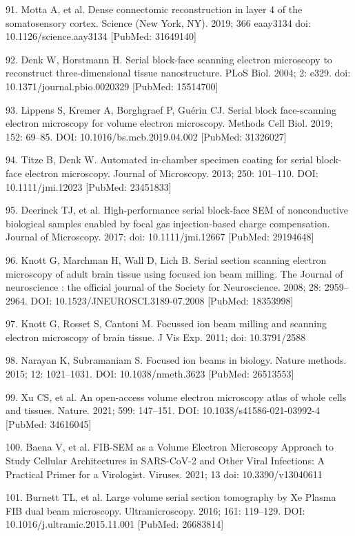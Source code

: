 \documentclass{article}
\begin{document}
\begin{hangpars}
91. Motta A, et al. Dense connectomic reconstruction in layer 4 of the somatosensory cortex. Science (New York, NY). 2019; 366 eaay3134 doi: 10.1126/science.aay3134 [PubMed: 31649140]

92. Denk W, Horstmann H. Serial block-face scanning electron microscopy to reconstruct three-dimensional tissue nanostructure. PLoS Biol. 2004; 2: e329. doi: 10.1371/journal.pbio.0020329 [PubMed: 15514700]

93. Lippens S, Kremer A, Borghgraef P, Guérin CJ. Serial block face-scanning electron microscopy for volume electron microscopy. Methods Cell Biol. 2019; 152: 69–85. DOI: 10.1016/bs.mcb.2019.04.002 [PubMed: 31326027]

94. Titze B, Denk W. Automated in-chamber specimen coating for serial block-face electron microscopy. Journal of Microscopy. 2013; 250: 101–110. DOI: 10.1111/jmi.12023 [PubMed: 23451833]

95. Deerinck TJ, et al. High-performance serial block-face SEM of nonconductive biological samples enabled by focal gas injection-based charge compensation. Journal of Microscopy. 2017; doi: 10.1111/jmi.12667 [PubMed: 29194648]

96. Knott G, Marchman H, Wall D, Lich B. Serial section scanning electron microscopy of adult brain tissue using focused ion beam milling. The Journal of neuroscience : the official journal of the Society for Neuroscience. 2008; 28: 2959–2964. DOI: 10.1523/JNEUROSCI.3189-07.2008 [PubMed: 18353998]

97. Knott G, Rosset S, Cantoni M. Focussed ion beam milling and scanning electron microscopy of brain tissue. J Vis Exp. 2011; doi: 10.3791/2588

98. Narayan K, Subramaniam S. Focused ion beams in biology. Nature methods. 2015; 12: 1021–1031. DOI: 10.1038/nmeth.3623 [PubMed: 26513553]

99. Xu CS, et al. An open-access volume electron microscopy atlas of whole cells and tissues. Nature. 2021; 599: 147–151. DOI: 10.1038/s41586-021-03992-4 [PubMed: 34616045]

100. Baena V, et al. FIB-SEM as a Volume Electron Microscopy Approach to Study Cellular Architectures in SARS-CoV-2 and Other Viral Infections: A Practical Primer for a Virologist. Viruses. 2021; 13 doi: 10.3390/v13040611

101. Burnett TL, et al. Large volume serial section tomography by Xe Plasma FIB dual beam microscopy. Ultramicroscopy. 2016; 161: 119–129. DOI: 10.1016/j.ultramic.2015.11.001 [PubMed: 26683814]


\end{hangpars}
\end{document}
